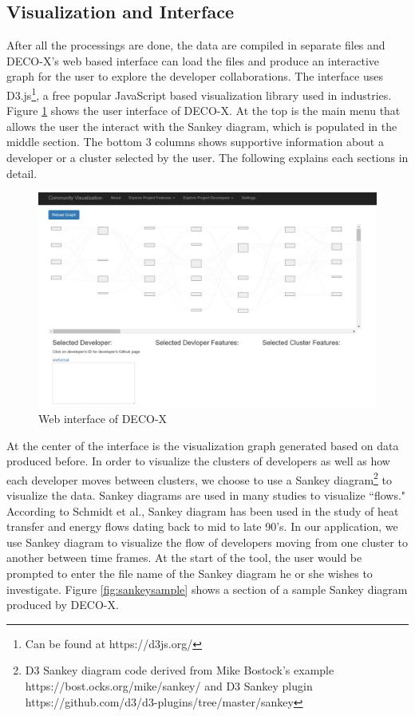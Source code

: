 \documentclass{article}
\begin{document}
\subsection{Visualization and Interface}
After all the processings are done, the data are compiled in separate files and DECO-X's web based interface can load the files and produce an interactive graph for the user to explore the developer collaborations. The interface uses D3.js\footnote{Can be found at https://d3js.org/}, a free popular JavaScript based visualization library used in industries. Figure \ref{fig:interface} shows the user interface of DECO-X. At the top is the main menu that allows the user the interact with the Sankey diagram, which is populated in the middle section. The bottom 3 columns shows supportive information about a developer or a cluster selected by the user. The following explains each sections in detail.\\
\begin{figure}[h!]
\centering
\includegraphics[scale=0.4]{images/interface.JPG}
\caption{Web interface of DECO-X}
\label{fig:interface}
\end{figure}
At the center of the interface is the visualization graph generated based on data produced before. In order to visualize the clusters of developers as well as how each developer moves between clusters, we choose to use a Sankey diagram\footnote{D3 Sankey diagram code derived from Mike Bostock's example https://bost.ocks.org/mike/sankey/ and D3 Sankey plugin https://github.com/d3/d3-plugins/tree/master/sankey} to visualize the data. Sankey diagrams are used in many studies to visualize ``flows." According to Schmidt et al.\citep{schmidt2008sankey}, Sankey diagram has been used in the study of heat transfer and energy flows dating back to mid to late 90's. In our application, we use Sankey diagram to visualize the flow of developers moving from one cluster to another between time frames. At the start of the tool, the user would be prompted to enter the file name of the Sankey diagram he or she wishes to investigate. Figure \ref{fig:sankeysample} shows a section of a sample Sankey diagram produced by DECO-X.\\
\end{document}
